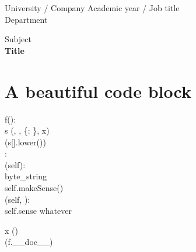 



\noindent
University / Company \hfill Academic year / Job title \\
Department \\

\begin{center}
	\Large{Subject}\\
	\vspace{0.5cm}
	\Huge\textbf{Title}\\
\end{center}

\vspace{1cm}

\section*{A beautiful code block}

\begin{mdframed}
 f(): \\
\indent s \op{=} (, \op{+}, \{: \}, x)  \\
\indent {}(s[].lower()) \\

 : \\
\indent {} (self): \\
\indent \indent byte\_string \op{=}  \\
\indent \indent self.makeSense(\op{=}) \\
    
\indent {} (self, ): \\
\indent\indent self.sense \op{=} whatever

x \op{=} () \\
(f.\_\_doc\_\_)
\end{mdframed}

